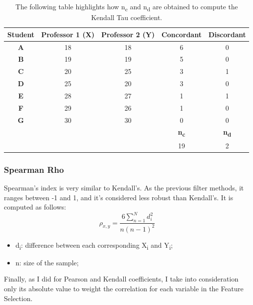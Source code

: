 \begin{table}[H]
\begin{center}
\begin{tabular}{|c| c| c| c |c|} 
\hline
 \textbf{Student} & \textbf{Professor 1 (X)} & \textbf{Professor 2 (Y)} & \textbf{Concordant} & \textbf{Discordant}\\ 
 \hline
 \textbf{A} & 18 & 18 & 6 &0 \\ 
 \hline
 \textbf{B} & 19 & 19 & 5 &0\\
 \hline
 \textbf{C} & 20 & 25 & 3 &1\\
 \hline
 \textbf{D} & 25 & 20 & 3 &0\\
 \hline
 \textbf{E} & 28 & 27 & 1 &1\\ 
 \hline
  \textbf{F} & 29 & 26 & 1& 0 \\  
 \hline
  \textbf{G} & 30 & 30 & 0& 0 \\ 
  \hline
 \hline
    &  &  & \textbf{n\textsubscript{c}} & \textbf{n\textsubscript{d}}\\ 
 \hline
     &  & & 19 & 2\\  
 \hline
\end{tabular}
\end{center}
\caption{The following table highlights how n\textsubscript{c} and n\textsubscript{d} are obtained to compute the Kendall Tau coefficient.}
\label{tab:kendall}
\end{table}





\subsubsection{Spearman Rho}
Spearman’s index is very similar to Kendall’s. As the previous filter methods, it ranges between -1 and 1, and it's considered less robust than Kendall's.
It is computed as follows:
\begin{equation}
\rho_{x,y} = \frac{6\sum_{n=1}^{N} d_i^2}{n(n-1)^2}
\end{equation}
\begin{itemize}
\item d\textsubscript{i}: difference between each corresponding X\textsubscript{i} and Y\textsubscript{i};
\item n: size of the sample;
\end{itemize}

Finally, as I did for Pearson and Kendall coefficients, I take into consideration only its absolute value to weight the correlation for each variable in the Feature Selection.

